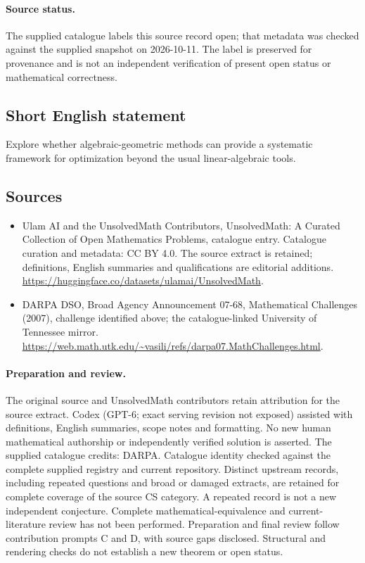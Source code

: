 \documentclass[11pt]{article}
\begin{document}
\paragraph{Source status.}
The supplied catalogue labels this source record open; that metadata was checked against the supplied snapshot on 2026-10-11. The label is preserved for provenance and is not an independent verification of present open status or mathematical correctness.
\subsection{Short English statement}
Explore whether algebraic-geometric methods can provide a systematic framework for optimization beyond the usual linear-algebraic tools.
\subsection{Sources}
\begin{itemize}
\item[\hypertarget{source:statement:1}{S1}] Ulam AI and the UnsolvedMath Contributors, UnsolvedMath: A Curated Collection of Open Mathematics Problems, catalogue entry. Catalogue curation and metadata: CC BY 4.0. The source extract is retained; definitions, English summaries and qualifications are editorial additions.
\url{https://huggingface.co/datasets/ulamai/UnsolvedMath}.
\item[\hypertarget{source:statement:2}{S2}] DARPA DSO, Broad Agency Announcement 07-68, Mathematical Challenges (2007), challenge identified above; the catalogue-linked University of Tennessee mirror.
\url{https://web.math.utk.edu/~vasili/refs/darpa07.MathChallenges.html}.
\end{itemize}
\paragraph{Preparation and review.}
The original source and UnsolvedMath contributors retain attribution for the source extract. Codex (GPT-6; exact serving revision not exposed) assisted with definitions, English summaries, scope notes and formatting. No new human mathematical authorship or independently verified solution is asserted. The supplied catalogue credits: DARPA. Catalogue identity checked against the complete supplied registry and current repository. Distinct upstream records, including repeated questions and broad or damaged extracts, are retained for complete coverage of the source CS category. A repeated record is not a new independent conjecture. Complete mathematical-equivalence and current-literature review has not been performed. Preparation and final review follow contribution prompts C and D, with source gaps disclosed. Structural and rendering checks do not establish a new theorem or open status.
\label{end:statement}
\end{document}
